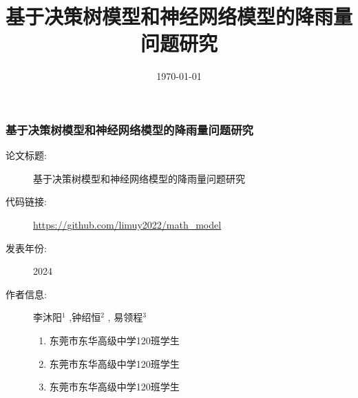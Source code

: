 \documentclass[10pt]{beamer}
\title[]{ {\Large 基于决策树模型和神经网络模型的降雨量问题研究 }}
\author[Arthur, Doe]{\textbf{李沐阳 \and 钟绍恒 \and 易领程}}
\institute[VFU] {}
\date{\today} %
\begin{document}
{
\frame{\titlepage}
}





\begin{frame}
	\frametitle{基于决策树模型和神经网络模型的降雨量问题研究}


	\begin{description}
		\item[论文标题:]  基于决策树模型和神经网络模型的降雨量问题研究
		\item[代码链接:]   \url{https://github.com/limuy2022/math_model}
		\item[发表年份:]   2024
		\item[作者信息:]   李沐阳$^1$ ,钟绍恒$^2$ , 易领程$^3$

		      \begin{enumerate}
			      \item  东莞市东华高级中学120班学生
			      \item 	 东莞市东华高级中学120班学生
			      \item 	 东莞市东华高级中学120班学生
		      \end{enumerate}
	\end{description}

\end{frame}
\end{document}

